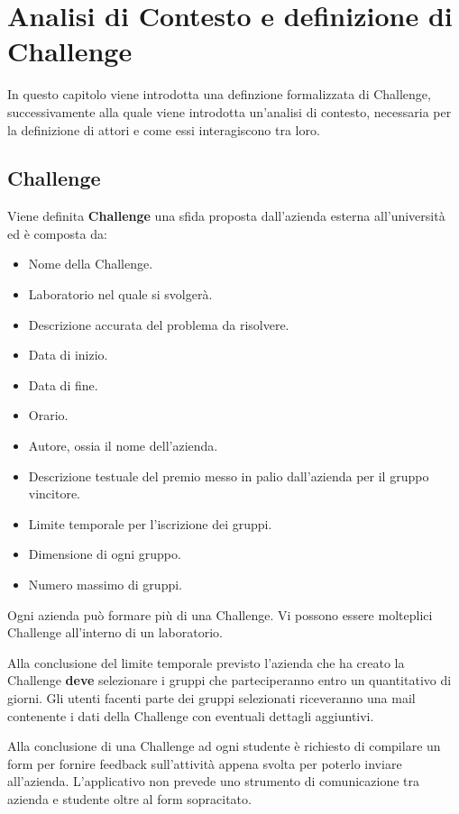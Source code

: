 \chapter{Analisi di Contesto e definizione di Challenge}

In questo capitolo viene introdotta una definzione formalizzata di Challenge, successivamente alla quale viene introdotta un'analisi di contesto, necessaria per la definizione di attori e come essi interagiscono tra loro.

\section{Challenge}
\label{sec:challenge}
Viene definita \textbf{Challenge} una sfida proposta dall'azienda esterna all'università ed è composta da:

\begin{itemize}
    \item Nome della Challenge.
    \item Laboratorio nel quale si svolgerà.
    \item Descrizione accurata del problema da risolvere.
    \item Data di inizio. 
    \item Data di fine.
    \item Orario.
    \item Autore, ossia il nome dell'azienda.
    \item Descrizione testuale del premio messo in palio dall'azienda per il gruppo vincitore.
    \item Limite temporale per l'iscrizione dei gruppi.
    \item Dimensione di ogni gruppo. 
    \item Numero massimo di gruppi.
\end{itemize}

Ogni azienda può formare più di una Challenge. Vi possono essere molteplici Challenge all'interno di un laboratorio.

Alla conclusione del limite temporale previsto l'azienda che ha creato la Challenge \textbf{deve} selezionare i gruppi che parteciperanno entro un quantitativo di giorni. Gli utenti facenti parte dei gruppi selezionati riceveranno una mail contenente i dati della Challenge con eventuali dettagli aggiuntivi.

Alla conclusione di una Challenge ad ogni studente è richiesto di compilare un form per fornire feedback sull'attività appena svolta per poterlo inviare all'azienda.
L'applicativo non prevede uno strumento di comunicazione tra azienda e studente oltre al form sopracitato.

